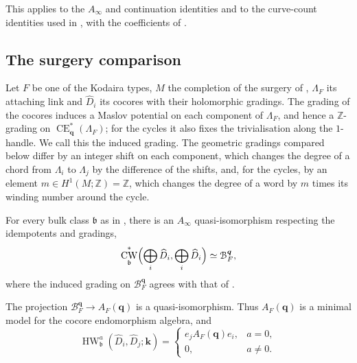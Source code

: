 \documentclass[a4paper]{amsart}
\newcommand{\kk}{\mathbf{k}}
\newcommand{\ZZ}{\mathbb{Z}}
\DeclareMathOperator{\CW}{CW}
\DeclareMathOperator{\CE}{CE}
\DeclareMathOperator{\HW}{HW}
\numberwithin{equation}{section}
\begin{document}
This applies to the $A_\infty$ and continuation identities and to the
curve-count identities used in
, with the coefficients of
.

\subsection{The surgery comparison}
\label{subsec:surgery-comparison}

Let $F$ be one of the Kodaira types, $M$ the completion of the surgery
of , $\Lambda_F$ its attaching link and
$\widehat D_i$ its cocores with their holomorphic gradings. The grading
of the cocores induces a Maslov potential on each component of
$\Lambda_F$, and hence a $\ZZ$-grading on $\CE^*_{\boldsymbol q}(\Lambda_F)$;
for the cycles it also fixes the trivialisation along the $1$-handle.
We call this the induced grading. The geometric gradings compared below
differ by an integer shift on each component, which changes the degree of a chord from $\Lambda_i$ to
$\Lambda_j$ by the difference of the shifts, and, for the cycles, by an
element $m\in H^1(M;\ZZ)=\ZZ$, which changes the degree of a word by $m$
times its winding number around the cycle.

\begin{proposition}\label{prop:bulk-cocores}
For every bulk class $\mathfrak b$ as in ,
there is an $A_\infty$ quasi-isomorphism respecting the idempotents
and gradings,
\begin{equation}\label{eq:wrapped-derived-mpa}
 \CW^*_{\mathfrak{b}}\Bigl(\bigoplus_i\widehat D_i,\bigoplus_i\widehat D_i\Bigr)
 \simeq\mathcal B_F^{\boldsymbol q},
\end{equation}
where the induced grading on $\mathcal B_F^{\boldsymbol q}$ agrees
with that of .

The projection $\mathcal B_F^{\boldsymbol q}\to A_F(\boldsymbol q)$
is a quasi-isomorphism. Thus $A_F(\boldsymbol q)$ is a minimal model
for the cocore endomorphism algebra, and
\begin{equation}\label{eq:bulk-hw}
 \HW_{\mathfrak{b}}^a(\widehat D_i,\widehat D_j;\kk)=
 \begin{cases}e_jA_F(\boldsymbol q)e_i,&a=0,\\0,&a\ne0.\end{cases}
\end{equation}
\end{proposition}
\end{document}
